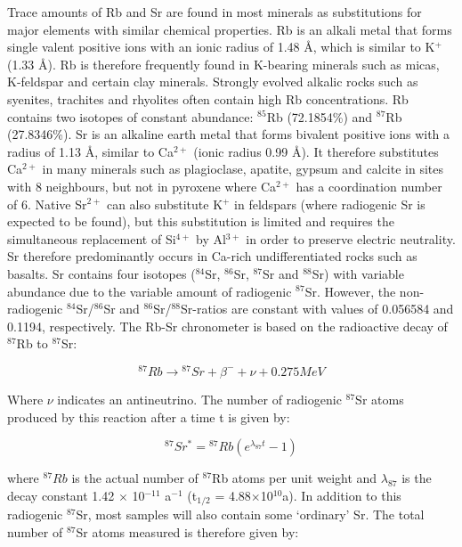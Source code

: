 Trace amounts of Rb and Sr are found in most minerals as substitutions
for major elements with similar chemical properties. Rb is an alkali
metal that forms single valent positive ions with an ionic radius of
1.48 \AA, which is similar to K$^+$ (1.33 \AA).  Rb is therefore
frequently found in K-bearing minerals such as micas, K-feldspar and
certain clay minerals. Strongly evolved alkalic rocks such as
syenites, trachites and rhyolites often contain high Rb
concentrations.  Rb contains two isotopes of constant abundance:
$^{85}$Rb (72.1854\%) and $^{87}$Rb (27.8346\%). Sr is an alkaline
earth metal that forms bivalent positive ions with a radius of 1.13
\AA, similar to Ca$^{2+}$ (ionic radius 0.99 \AA). It therefore
substitutes Ca$^{2+}$ in many minerals such as plagioclase, apatite,
gypsum and calcite in sites with 8 neighbours, but not in pyroxene
where Ca$^{2+}$ has a coordination number of 6. Native Sr$^{2+}$ can
also substitute K$^+$ in feldspars (where radiogenic Sr is expected to
be found), but this substitution is limited and requires the
simultaneous replacement of Si$^{4+}$ by Al$^{3+}$ in order to
preserve electric neutrality.  Sr therefore predominantly occurs in
Ca-rich undifferentiated rocks such as basalts. Sr contains four
isotopes ($^{84}$Sr, $^{86}$Sr, $^{87}$Sr and $^{88}$Sr) with variable
abundance due to the variable amount of radiogenic $^{87}$Sr. However,
the non-radiogenic $^{84}$Sr/$^{86}$Sr and $^{86}$Sr/$^{88}$Sr-ratios
are constant with values of 0.056584 and 0.1194, respectively. The
Rb-Sr chronometer is based on the radioactive decay of $^{87}$Rb to
$^{87}$Sr:

\begin{equation}
{}^{87}Rb \rightarrow {}^{87}Sr + \beta^- + \nu +
0.275 MeV
\label{eq:87Rb}
\end{equation}

Where $\nu$ indicates an antineutrino. The number of radiogenic
${}^{87}$Sr atoms produced by this reaction after a time t is given
by:

\begin{equation}
{}^{87}Sr^* = {}^{87}Rb (e^{\lambda_{87} t} - 1)
\label{eq:87Sr*}
\end{equation}

where $^{87}Rb$ is the actual number of $^{87}$Rb atoms per unit
weight and $\lambda_{87}$ is the decay constant 1.42 $\times$
10$^{-11}$ a$^{-1}$ (t$_{1/2}$ = 4.88$\times$10$^{10}$a).  In addition
to this radiogenic $^{87}$Sr, most samples will also contain some
`ordinary' Sr. The total number of $^{87}$Sr atoms measured is
therefore given by:

